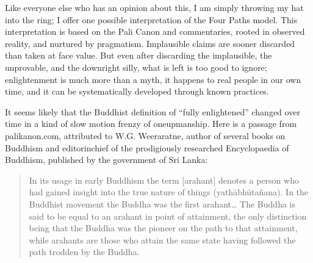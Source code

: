 \documentclass[a5paper,10pt,english]{book}
\begin{document}
\sphinxAtStartPar
Like everyone else who has an opinion about this, I am simply throwing
my hat into the ring; I offer one possible interpretation of the Four
Paths model. This interpretation is based on the Pali Canon and
commentaries, rooted in observed reality, and nurtured by pragmatism.
Implausible claims are sooner discarded than taken at face value. But
even after discarding the implausible, the unprovable, and the downright
silly, what is left is too good to ignore; enlightenment is much more
than a myth, it happens to real people in our own time, and it can be
systematically developed through known practices.

\sphinxAtStartPar
It seems likely that the Buddhist definition of “fully enlightened”
changed over time in a kind of slow motion frenzy of one\sphinxhyphen{}upmanship. Here
is a passage from palikanon.com, attributed to W.G. Weeraratne, author
of several books on Buddhism and editor\sphinxhyphen{}in\sphinxhyphen{}chief of the prodigiously
researched Encyclopaedia of Buddhism, published by the government of Sri
Lanka:
\begin{quote}

\sphinxAtStartPar
In its usage in early Buddhism the term {[}arahant{]} denotes a person
who had gained insight into the true nature of things
(yathābhūtañana). In the Buddhist movement the Buddha was the first
arahant… The Buddha is said to be equal to an arahant in point of
attainment, the only distinction being that the Buddha was the
pioneer on the path to that attainment, while arahants are those who
attain the same state having followed the path trodden by the
Buddha. 
\end{quote}
\end{document}

